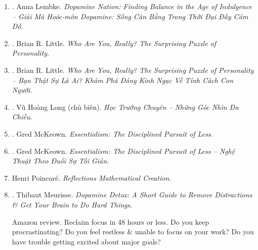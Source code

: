 \documentclass{article}
\begin{document}
\begin{enumerate}
\begin{itemize}
		-- [1] cuộc khảo sát mở mang tầm mắt về việc tìm kiếm niềm vui \& chứng nghiện $\ldots$ Những độc giả đang tìm kiếm sự cân bằng sẽ quay lại với hướng dẫn đầy thông tin \& hấp dẫn của Lembke.
		\item ``Fascinating case histories, \& a sensible formula for treatment.'' -- {\it Kirkus Reviews}

		-- Lịch sử các trường hợp hấp dẫn, \& 1 công thức điều trị hợp lý.
	\end{itemize}

	\item \cite{Lembke_dopamine_VN}. {\sc Anna Lembke}. {\it Dopamine Nation: Finding Balance in the Age of Indulgence -- Giải Mã Hoóc-môn Dopamine: Sống Cân Bằng Trong Thời Đại Đầy Cám Dỗ}.\hfill{\sf[done]}

	\item \cite{Little_personality}. {\sc Brian R. Little}. {\it Who Are You, Really? The Surprising Puzzle of Personality}.\hfill{\sf[done]}

	\item \cite{Little_personality_VN}. {\sc Brian R. Little}. {\it Who Are You, Really? The Surprising Puzzle of Personality -- Bạn Thật Sự Là Ai? Khám Phá Đáng Kinh Ngạc Về Tính Cách Con Người}.\hfill{\sf[done]}

	\item \cite{Long_truong_chuyen}. Vũ Hoàng Long (chủ biên). {\it Học Trường Chuyên -- Những Góc Nhìn Đa Chiều}.\hfill{\sf[done]}
	\item \cite{McKeown_essentialism}. {\sc Gred McKeown}. {\it Essentialism: The Disciplined Pursuit of Less}.

	\item \cite{McKeown_essentialism_VN}. {\sc Gred McKeown}. {\it Essentialism: The Disciplined Pursuit of Less -- Nghệ Thuật Theo Đuổi Sự Tối Giản}.\hfill{\sf[done]}

	\item {\sc Henri Poincar\'e}. {\it Reflections Mathematical Creation}.\hfill{\sf[done]}

	\item \cite{Meurisse_dopamine}. {\sc Thibaut Meurisse}. {\it Dopamine Detox: A Short Guide to Remove Distractions \& Get Your Brain to Do Hard Things}. {}

	{\sf Amazon review.} Reclaim focus in 48 hours or less. Do you keep procrastinating? Do you feel restless \& unable to focus on your work? Do you have trouble getting excited about major goals?


\end{enumerate}
\end{document}
